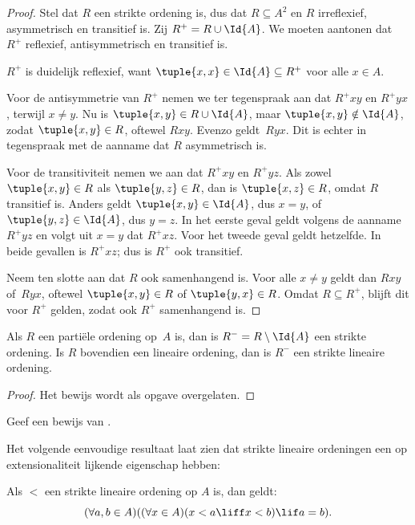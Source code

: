 \documentclass[openany]{memoir}
\begin{document}
\begin{proof}
Stel dat $R$ een strikte ordening is, dus dat $R \subseteq A^2$ en $R$
irreflexief, asymmetrisch en transitief is. Zij $R^+ = R \cup \Id{A}$. We
moeten aantonen dat $R^+$ reflexief, antisymmetrisch en transitief is.

$R^+$ is duidelijk reflexief, want $\tuple{x, x} \in \Id{A} \subseteq
R^+$ voor alle $x \in A$. 

Voor de antisymmetrie van $R^+$ nemen we ter tegenspraak aan dat
$R^+xy$ en $R^+yx$, terwijl $x \neq y$. Nu is $\tuple{x,y} \in R \cup \Id{A}$,
maar $\tuple{x, y} \notin \Id{A}$, zodat $\tuple{x, y} \in R$, oftewel
$Rxy$. Evenzo geldt~$Ryx$. Dit is echter in tegenspraak met de aanname
dat $R$ asymmetrisch is.

Voor de transitiviteit nemen we aan dat $R^+xy$ en $R^+yz$. Als zowel
$\tuple{x, y} \in R$ als $\tuple{y,z} \in R$, dan is $\tuple{x, z} \in
R$, omdat $R$ transitief is. Anders geldt $\tuple{x, y} \in
\Id{A}$, dus $x = y$, of $\tuple{y, z} \in \Id{A}$, dus $y = z$.
In het eerste geval geldt volgens de aanname $R^+yz$ en volgt uit $x = y$ dat
$R^+xz$. Voor het tweede geval geldt hetzelfde. In beide gevallen is $R^+xz$;
dus is $R^+$ ook transitief.

Neem ten slotte aan dat $R$ ook samenhangend is.
Voor alle $x \neq y$ geldt dan $Rxy$ of~$Ryx$, oftewel
$\tuple{x, y} \in R$ of $\tuple{y, x} \in R$. Omdat $R \subseteq R^+$,
blijft dit voor $R^+$ gelden, zodat ook $R^+$ samenhangend is.
\end{proof}

\begin{prop}
Als $R$ een partiële ordening op~$A$ is, dan is $R^- = R \setminus \Id{A}$ een
strikte ordening. Is $R$ bovendien een lineaire ordening, dan is $R^-$ een
strikte lineaire ordening.
\end{prop}

\begin{proof}
Het bewijs wordt als opgave overgelaten.
\end{proof}

\begin{prob}
Geef een bewijs van . 
\end{prob}

Het volgende eenvoudige resultaat laat zien dat strikte lineaire ordeningen
een op extensionaliteit lijkende eigenschap hebben:

\begin{prop}
Als $<$ een strikte lineaire ordening op $A$ is, dan geldt:
\[
  (\forall a, b \in A)((\forall x \in A)(x < a \liff x < b) \lif a = b).
\]
\end{prop}
\end{document}
